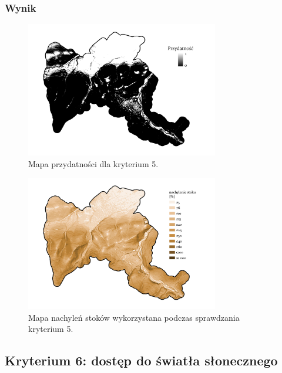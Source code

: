 \documentclass{article}
\begin{document}
\subsubsection{Wynik}
\begin{figure}[H]
    \centering
    \includegraphics[width=0.75\textwidth]{img/kryterium5-layout.jpg}
    \caption*{Mapa przydatności dla kryterium 5.}
\end{figure}

\begin{figure}[H]
    \centering
    \includegraphics[width=0.75\textwidth]{img/kryterium5-stoki.jpg}
    \caption*{Mapa nachyleń stoków wykorzystana podczas sprawdzania kryterium 5.}
\end{figure}

\newpage
\subsection{Kryterium 6: dostęp do światła słonecznego}
\end{document}

